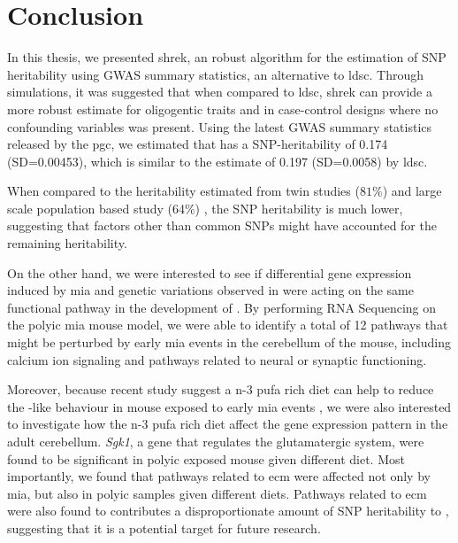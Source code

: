 \documentclass[12pt]{scrbook}
\newcommand*{\glng}{\glsentrylong}
\begin{document}
	\chapter{Conclusion}
	\label{conclusionChapter}
	\glsresetall
	In this thesis, we presented \gls{shrek}, an robust algorithm for the estimation of \gls{SNP} heritability using \gls{GWAS} summary statistics, an alternative to \gls{ldsc}.
	Through simulations, it was suggested that when compared to \gls{ldsc}, \gls{shrek} can provide a more robust estimate for oligogentic traits and in case-control designs where no confounding variables was present. 
	Using the latest \gls{GWAS} summary statistics released by the \gls{pgc}, we estimated that \glng{scz} has a \gls{SNP}-heritability of 0.174 (SD=0.00453), which is similar to the estimate of 0.197 (SD=0.0058) by \gls{ldsc}.
	
	When compared to the heritability estimated from twin studies ($81\%$) \citep{Sullivan2003} and large scale population based study (64\%) \citep{Lichtenstein2009}, the \gls{SNP} heritability is much lower, suggesting that factors other than common \glspl{SNP} might have accounted for the remaining heritability.
	
	On the other hand, we were interested to see if differential gene expression induced by \gls{mia} and genetic variations observed in \glng{scz} were acting on the same functional pathway in the development of \glng{scz}.
	By performing RNA Sequencing on the \gls{polyic} \gls{mia} mouse model, we were able to identify a total of 12 pathways that might be perturbed by early \gls{mia} events in the cerebellum of the mouse, including calcium ion signaling and pathways related to neural or synaptic functioning.
	
	Moreover, because recent study suggest a n-3 \gls{pufa} rich diet can help to reduce the \glng{scz}-like behaviour in mouse exposed to early \gls{mia} events \citep{Li2015}, we were also interested to investigate how the n-3 \gls{pufa} rich diet affect the gene expression pattern in the adult cerebellum.
	\textit{Sgk1}, a gene that regulates the glutamatergic system, were found to be significant in \gls{polyic} exposed mouse given different diet. 
	Most importantly, we found that pathways related to \gls{ecm} were affected not only by \gls{mia}, but also in \gls{polyic} samples given different diets. 
	Pathways related to \gls{ecm} were also found to contributes a disproportionate amount of \gls{SNP} heritability to \glng{scz}, suggesting that it is a potential target for future research.
	
\end{document}
